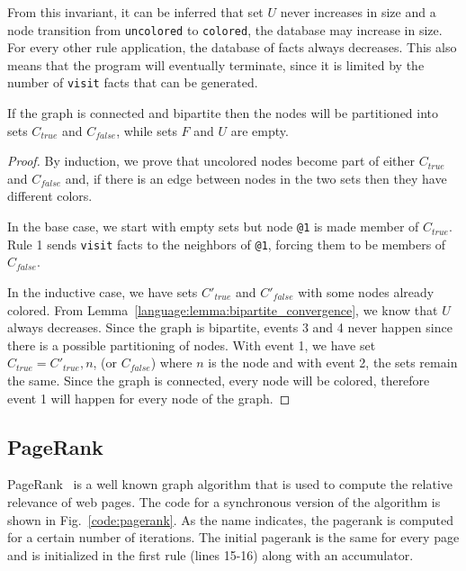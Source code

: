 From this invariant, it can be inferred that set $U$ never increases in size
and a node transition from \texttt{uncolored} to \texttt{colored}, the
database may increase in size. For every other rule application, the database of
facts always decreases. This also means that the program will eventually
terminate, since it is limited by the number of \texttt{visit} facts that can be
generated.

\begin{theorem}
If the graph is connected and bipartite then the nodes will be partitioned into
sets $C_{true}$ and $C_{false}$, while sets $F$ and $U$ are empty.
\end{theorem}
\begin{proof}
   By induction, we prove that uncolored nodes become part of either $C_{true}$
   and $C_{false}$ and, if there is an edge between nodes in the two sets then
   they have different colors.

   In the base case, we start with empty sets but node \texttt{@1} is made
   member of $C_{true}$. Rule 1 sends \texttt{visit} facts to the neighbors of
   \texttt{@1}, forcing them to be members of $C_{false}$.

   In the inductive case, we have sets $C'_{true}$ and $C'_{false}$ with some
   nodes already colored. From Lemma~\ref{language:lemma:bipartite_convergence},
   we know that $U$ always decreases. Since the graph is bipartite, events 3 and
   4 never happen since there is a possible partitioning of nodes. With event 1,
   we have set $C_{true} = C'_{true}, n$, (or $C_{false}$) where $n$ is the
   node and with event 2, the sets remain the same. Since the graph is
   connected, every node will be colored, therefore event 1 will happen for
   every node of the graph.
\end{proof}

\subsection{PageRank}

PageRank~\cite{Page:2001:MNR} is a well known graph algorithm that is used to compute the relative relevance of web pages.
The code for a synchronous version of the algorithm is shown in Fig.~\ref{code:pagerank}.
As the name indicates, the pagerank is computed for a certain number of iterations. The initial pagerank is the same for every page and is
initialized in the first rule (lines 15-16) along with an accumulator.

